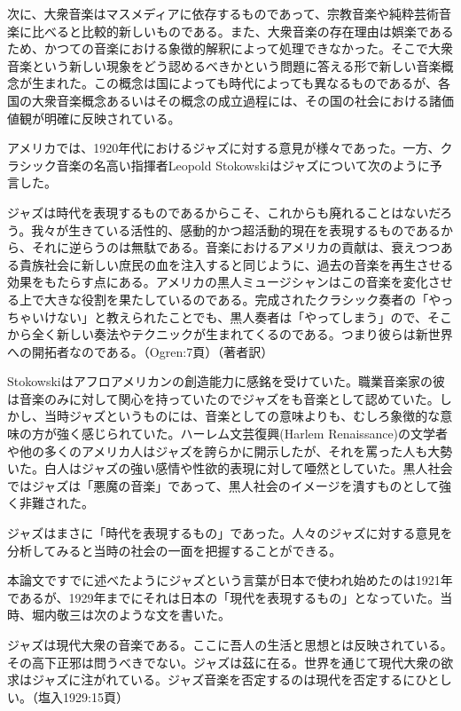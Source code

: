 次に、大衆音楽はマスメディアに依存するものであって、宗教音楽や純粋芸術音楽に比べると比較的新しいものである。また、大衆音楽の存在理由は娯楽であるため、かつての音楽における象徴的解釈によって処理できなかった。そこで大衆音楽という新しい現象をどう認めるべきかという問題に答える形で新しい音楽概念が生まれた。この概念は国によっても時代によっても異なるものであるが、各国の大衆音楽概念あるいはその概念の成立過程には、その国の社会における諸価値観が明確に反映されている。

アメリカでは、1920年代におけるジャズに対する意見が様々であった。一方、クラシック音楽の名高い指揮者Leopold Stokowskiはジャズについて次のように予言した。

\begin{gquote}
ジャズは時代を表現するものであるからこそ、これからも廃れることはないだろう。我々が生きている活性的、感動的かつ超活動的現在を表現するものであるから、それに逆らうのは無駄である。音楽におけるアメリカの貢献は、衰えつつある貴族社会に新しい庶民の血を注入すると同じように、過去の音楽を再生させる効果をもたらす点にある。アメリカの黒人ミュージシャンはこの音楽を変化させる上で大きな役割を果たしているのである。完成されたクラシック奏者の「やっちゃいけない」と教えられたことでも、黒人奏者は「やってしまう」ので、そこから全く新しい奏法やテクニックが生まれてくるのである。つまり彼らは新世界への開拓者なのである。（Ogren:7頁）（著者訳）
\end{gquote}

Stokowskiはアフロアメリカンの創造能力に感銘を受けていた。職業音楽家の彼は音楽のみに対して関心を持っていたのでジャズをも音楽として認めていた。しかし、当時ジャズというものには、音楽としての意味よりも、むしろ象徴的な意味の方が強く感じられていた。ハーレム文芸復興(Harlem Renaissance)の文学者や他の多くのアメリカ人はジャズを誇らかに開示したが、それを罵った人も大勢いた。白人はジャズの強い感情や性欲的表現に対して唖然としていた。黒人社会ではジャズは「悪魔の音楽」であって、黒人社会のイメージを潰すものとして強く非難された。

ジャズはまさに「時代を表現するもの」であった。人々のジャズに対する意見を分析してみると当時の社会の一面を把握することができる。

本論文ですでに述べたようにジャズという言葉が日本で使われ始めたのは1921年であるが、1929年までにそれは日本の「現代を表現するもの」となっていた。当時、堀内敬三は次のような文を書いた。

\begin{gquote}
ジャズは現代大衆の音楽である。ここに吾人の生活と思想とは反映されている。その高下正邪は問うべきでない。ジャズは茲に在る。世界を通じて現代大衆の欲求はジャズに注がれている。ジャズ音楽を否定するのは現代を否定するにひとしい。（塩入1929:15頁）
\end{gquote}

